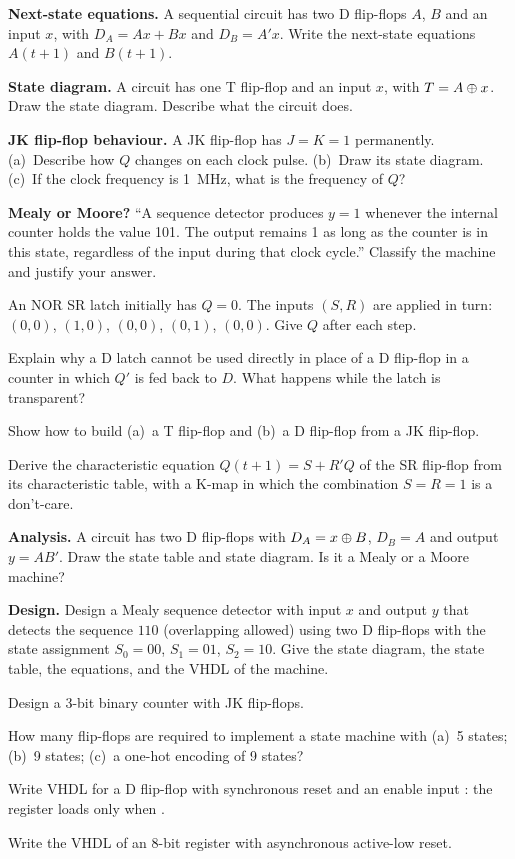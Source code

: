 \begin{exlist}
  \item \textbf{Next-state equations.} A sequential circuit has two D flip-flops $A$, $B$ and an input $x$, with $D_A=Ax+Bx$ and $D_B=A'x$. Write the next-state equations $A(t+1)$ and $B(t+1)$.
  \item \textbf{State diagram.} A circuit has one T flip-flop and an input $x$, with $T=A\oplus x$. Draw the state diagram. Describe what the circuit does.
  \item \textbf{JK flip-flop behaviour.} A JK flip-flop has $J=K=1$ permanently. (a)~Describe how $Q$ changes on each clock pulse. (b)~Draw its state diagram. (c)~If the clock frequency is 1~MHz, what is the frequency of $Q$?
  \item \textbf{Mealy or Moore?} ``A sequence detector produces $y=1$ whenever the internal counter holds the value 101. The output remains 1 as long as the counter is in this state, regardless of the input during that clock cycle.'' Classify the machine and justify your answer.
  \item An NOR SR latch initially has $Q=0$. The inputs $(S,R)$ are applied in turn: $(0,0)$, $(1,0)$, $(0,0)$, $(0,1)$, $(0,0)$. Give $Q$ after each step.
  \item Explain why a D latch cannot be used directly in place of a D flip-flop in a counter in which $Q'$ is fed back to $D$. What happens while the latch is transparent?
  \item Show how to build (a)~a T flip-flop and (b)~a D flip-flop from a JK flip-flop.
  \item Derive the characteristic equation $Q(t+1)=S+R'Q$ of the SR flip-flop from its characteristic table, with a K-map in which the combination $S=R=1$ is a don't-care.
  \item \textbf{Analysis.} A circuit has two D flip-flops with $D_A=x\oplus B$, $D_B=A$ and output $y=AB'$. Draw the state table and state diagram. Is it a Mealy or a Moore machine?
  \item \textbf{Design.} Design a Mealy sequence detector with input $x$ and output $y$ that detects the sequence $110$ (overlapping allowed) using two D flip-flops with the state assignment $S_0=00$, $S_1=01$, $S_2=10$. Give the state diagram, the state table, the equations, and the VHDL of the machine.
  \item Design a 3-bit binary counter with JK flip-flops.
  \item How many flip-flops are required to implement a state machine with (a)~5 states; (b)~9 states; (c)~a one-hot encoding of 9 states?
  \item Write VHDL for a D flip-flop with synchronous reset and an enable input : the register loads  only when .
  \item Write the VHDL of an 8-bit register with asynchronous active-low reset.
\end{exlist}

